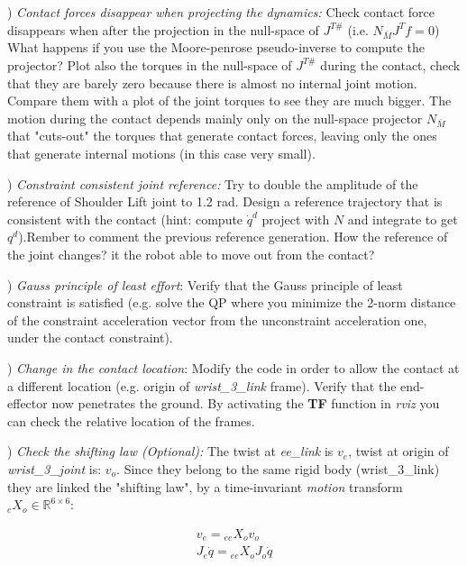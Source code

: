 \documentclass{report}
\newcommand{\Rnum}{\mathbb{R}} %
\begin{document}
\quad


) \textit{Contact forces disappear when projecting the dynamics:}
Check contact force disappears when after the projection in the null-space of $J^{T \#}$  (i.e. $ N_{\bar{M}}J^Tf = 0$) 
What happens if you use the Moore-penrose pseudo-inverse to compute the projector?
Plot also the torques in the null-space of $J^{T \#}$ during the contact, check that they are barely zero 
 because there is almost no internal joint motion. 
Compare them with a plot of the joint torques to see they are much bigger.
The motion during the contact depends mainly only on the null-space projector $N_{\bar{M}}$
that "cuts-out" the torques that generate contact forces, leaving only the ones that generate internal motions (in this case very small).

\quad

) \textit{Constraint consistent joint reference:}
Try to double the amplitude of the reference of Shoulder Lift joint to 1.2 rad.
Design a reference trajectory that is consistent with the contact (hint: compute $\dot{q}^{d}$ project with $N$ and integrate to get $q^d$).Rember to comment the previous reference generation.
How the reference of the joint changes? it the robot able to move out from the contact?

\quad

) \textit{Gauss principle of least effort}:
Verify that the Gauss principle of least constraint is satisfied (e.g. solve the QP where you minimize the 2-norm distance of the constraint acceleration vector from the unconstraint acceleration one,  under the contact constraint).

\quad

)  \textit{Change in the contact location}:
Modify the code in order to allow the contact at a different location (e.g. origin of \textit{wrist\_3\_link} frame).  Verify that the end-effector now penetrates the ground. 
By activating the \textbf{TF} function in \textit{rviz} you can check the relative location of the frames. 

\quad

) \textit{Check the shifting law (Optional):}
The twist at\textit{ ee\_link} is $v_{e}$, twist at origin of \textit{wrist\_3\_joint} is: $v_o$. Since they belong to the same rigid body (wrist\_3\_link) they are linked the "shifting law",  by a time-invariant \textit{motion} transform ${}_{e}X_o \in \Rnum^{6 \times 6}$:

\begin{align}
  v_{e} = {}_{ee}X_o v_o\\
  J_{e} \dot{q} = {}_{ee}X_o J_o \dot{q}
	\label{fig:}
\end{align}
\end{document}
